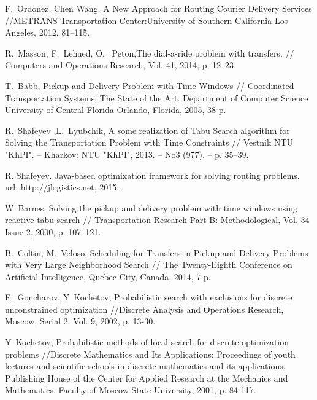\documentclass[]{TAACpaper}
\begin{document}
\begin{thebibliography}{99}
 F.~Ordonez, Chen Wang, A New Approach for Routing Courier Delivery Services //METRANS Transportation Center:University of Southern California
Los Angeles,  2012, 81--115.

 R.~Masson, F.~Lehued, O.~ Peton,The dial-a-ride problem with transfers. // Computers and Operations Research, Vol. 41, 2014, p. 12--23.

 T.~Babb, Pickup and Delivery Problem with Time Windows // Coordinated Transportation Systems: The State of the Art. Department of Computer Science University of Central Florida Orlando, Florida, 2005, 38 p.

 R.~Shafeyev ,L.~Lyubchik, A some realization of Tabu Search algorithm for Solving the Transportation Problem with Time Constraints // Vestnik NTU "KhPI". – Kharkov: NTU
"KhPI", 2013. – No3 (977). – p. 35–39.

  R. Shafeyev. Java-based optimixation framework for solving routing problems.\\ url: http://jlogistics.net, 2015.

 W~Barnes, Solving the pickup and delivery problem with time windows using reactive tabu search // Transportation Research Part B: Methodological, Vol. 34 Issue 2, 2000, p. 107--121.

 B.~Coltin, M.~Veloso, Scheduling for Transfers in Pickup and Delivery Problems with Very Large Neighborhood Search // The Twenty-Eighth Conference on Artificial Intelligence, Quebec City, Canada, 2014, 7 p.

 E.~Goncharov, Y~Kochetov, Probabilistic search with exclusions for discrete unconstrained optimization  //Discrete Analysis and Operations Research, Moscow, Serial 2. Vol. 9, 2002, p. 13-30.

   Y~Kochetov, Probabilistic methods of local search for discrete optimization problems //Discrete Mathematics and Its Applications: Proceedings of youth lectures and scientific schools in discrete mathematics and its applications, Publishing House of the Center for Applied Research at the Mechanics and Mathematics. Faculty of Moscow State University, 2001, p. 84-117.  


\end{thebibliography}
\end{document}
